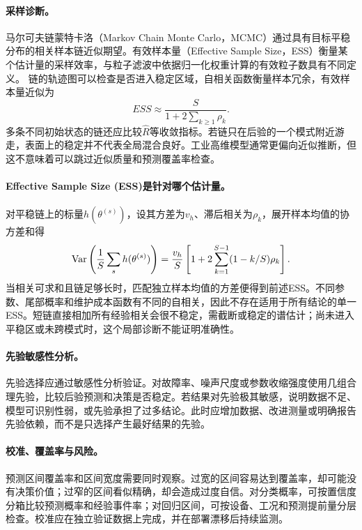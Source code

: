 \paragraph{采样诊断。}
马尔可夫链蒙特卡洛（Markov Chain Monte Carlo，MCMC）通过具有目标平稳分布的相关样本链近似期望。有效样本量（Effective Sample Size，ESS）衡量某个估计量的采样效率，与粒子滤波中依据归一化权重计算的有效粒子数具有不同定义。
链的轨迹图可以检查是否进入稳定区域，自相关函数衡量样本冗余，有效样本量近似为
\begin{equation}
 ESS\approx\frac{S}{1+2\sum_{k\geq1}\rho_k}.
\end{equation}
多条不同初始状态的链还应比较$\hat R$等收敛指标。若链只在后验的一个模式附近游走，表面上的稳定并不代表全局混合良好。工业高维模型通常更偏向近似推断，但这不意味着可以跳过近似质量和预测覆盖率检查。

\paragraph{Effective Sample Size (ESS)是针对哪个估计量。}
对平稳链上的标量$h(\theta^{(s)})$，设其方差为$v_h$、滞后相关为$\rho_k$，展开样本均值的协方差和得
\begin{equation}
 \operatorname{Var}\left(\frac1S\sum_sh(\theta^{(s)})\right)
 =\frac{v_h}{S}\left[1+2\sum_{k=1}^{S-1}(1-k/S)\rho_k\right].
\end{equation}
当相关可求和且链足够长时，匹配独立样本均值的方差便得到前述ESS。不同参数、尾部概率和维护成本函数有不同的自相关，因此不存在适用于所有结论的单一ESS。短链直接相加所有经验相关会很不稳定，需截断或稳定的谱估计；尚未进入平稳区或未跨模式时，这个局部诊断不能证明准确性。

\paragraph{先验敏感性分析。}
先验选择应通过敏感性分析验证。对故障率、噪声尺度或参数收缩强度使用几组合理先验，比较后验预测和决策是否稳定。若结果对先验极其敏感，说明数据不足、模型可识别性弱，或先验承担了过多结论。此时应增加数据、改进测量或明确报告先验依赖，而不是只选择产生最好结果的先验。

\paragraph{校准、覆盖率与风险。}
预测区间覆盖率和区间宽度需要同时观察。过宽的区间容易达到覆盖率，却可能没有决策价值；过窄的区间看似精确，却会造成过度自信。对分类概率，可按置信度分箱比较预测概率和经验事件率；对回归区间，可按设备、工况和预测提前量分层检查。校准应在独立验证数据上完成，并在部署漂移后持续监测。


